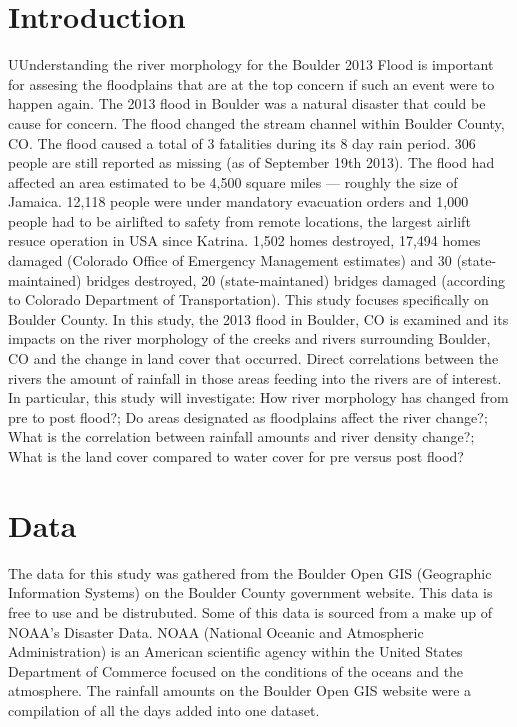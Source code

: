 \documentclass[twoside]{article}
\begin{document}
\begin{multicols}{2} %

\section{Introduction}

\lettrine[nindent=0em,lines=3]{U}Understanding the river morphology for the Boulder 2013 Flood is important for assesing the floodplains that are at the top concern if such an event were to happen again. The 2013 flood in Boulder was a natural disaster that could be cause for concern. The flood changed the stream channel within Boulder County, CO. The flood caused a total of 3 fatalities during its 8 day rain period. 306 people are still reported as missing (as of September 19th 2013). The flood had affected an area estimated to be 4,500 square miles --- roughly the size of Jamaica. 12,118 people were under mandatory evacuation orders and 1,000 people had to be airlifted to safety from remote locations, the largest airlift resuce operation in USA since Katrina. 1,502 homes destroyed, 17,494 homes damaged (Colorado Office of Emergency Management estimates) and 30 (state-maintained) bridges destroyed, 20 (state-maintaned) bridges damaged (according to Colorado Department of Transportation). \cite{facts} This study focuses specifically on Boulder County. In this study, the 2013 flood in Boulder, CO is examined and its impacts on the river morphology of the creeks and rivers surrounding Boulder, CO and the change in land cover that occurred. Direct correlations between the rivers the amount of rainfall in those areas feeding into the rivers are of interest. In particular, this study will investigate: How river morphology has changed from pre to post flood?; Do areas designated as floodplains affect the river change?; What is the correlation between rainfall amounts and river density change?; What is the land cover compared to water cover for pre versus post flood?

\section{Data}
The data for this study was gathered from the Boulder Open GIS (Geographic Information Systems) on the Boulder County government website. This data is free to use and be distrubuted. Some of this data is sourced from a make up of NOAA's Disaster Data. NOAA (National Oceanic and Atmospheric Administration) is an American scientific agency within the United States Department of Commerce focused on the conditions of the oceans and the atmosphere. \cite{NOAA} The rainfall amounts on the Boulder Open GIS website were a compilation of all the days added into one dataset. 



\end{multicols}
\end{document}
